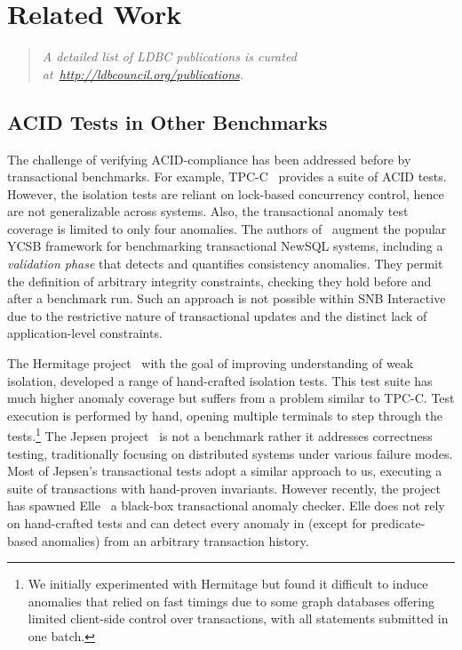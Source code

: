 \chapter{Related Work}
\label{sec:related-work}

\begin{quote}
    \textit{A detailed list of LDBC publications is curated at~\url{http://ldbcouncil.org/publications}.}
\end{quote}


\section{ACID Tests in Other Benchmarks}

The challenge of verifying ACID-compliance has been addressed before by transactional benchmarks.
For example, TPC-C~\cite{tpcc} provides a suite of ACID tests.
However, the isolation tests are reliant on lock-based concurrency control, hence are not generalizable across systems.
Also, the transactional anomaly test coverage is limited to only four anomalies.
The authors of~\cite{DBLP:conf/icde/DeyFNR14} augment the popular YCSB framework for benchmarking transactional NewSQL systems, including a \emph{validation phase} that detects and quantifies consistency anomalies.
They permit the definition of arbitrary integrity constraints, checking they hold before and after a benchmark run.
Such an approach is not possible within SNB Interactive due to the restrictive nature of transactional updates and the distinct lack of application-level constraints.

The Hermitage project~\cite{Hermitage} with the goal of improving understanding of weak isolation, developed a range of hand-crafted isolation tests.
This test suite has much higher anomaly coverage but suffers from a problem similar to TPC-C.
Test execution is performed by hand, opening multiple terminals to step through the tests.\footnote{We initially experimented with Hermitage but found it difficult to induce anomalies that relied on fast timings due to some graph databases offering limited client-side control over transactions, with all statements submitted in one batch.}
The Jepsen project~\cite{kingsbury} is not a benchmark rather it addresses correctness testing, traditionally focusing on distributed systems under various failure modes.
Most of Jepsen's transactional tests adopt a similar approach to us, executing a suite of transactions with hand-proven invariants.
However recently, the project has spawned Elle~\cite{DBLP:journals/corr/abs-2003-10554} a black-box transactional anomaly checker.
Elle does not rely on hand-crafted tests and can detect every anomaly in \cite{adya1999weak} (except for predicate-based anomalies) from an arbitrary transaction history.

